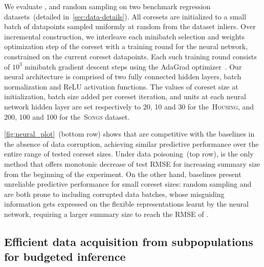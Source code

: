 We evaluate \bcores, \sparsevi{} and random sampling on two benchmark regression datasets~(detailed in~\cref{sec:data-details}). All coresets are initialized to a small batch of datapoints sampled uniformly at random from the dataset inliers. Over incremental construction, we interleave each minibatch selection and weights optimization step of the coreset with a training round for the neural network, constrained on the current coreset datapoints. Each such training round consists of $10^3$ minibatch gradient descent steps using the AdaGrad optimizer~\citep{mcmahan10,duchi10,duchi11}.
Our neural architecture is comprised of two fully connected hidden layers, batch normalization and ReLU activation functions. The values of coreset size at initialization, batch size added per coreset iteration, and units at each neural network hidden layer are set respectively to 20, 10 and 30 for the~\textsc{Housing}, and 200, 100 and 100 for the~\textsc{Songs} dataset.


\cref{fig:neural_plot}~(bottom row) shows that \bcores{} are competitive with the baselines in the absence of data corruption, achieving similar predictive performance over the entire range of tested coreset sizes. Under data poisoning~(top row), \bcores{} is the only method that offers monotonic decrease of test RMSE for increasing summary size from the beginning of the experiment. On the other hand, baselines present unreliable predictive performance for small coreset sizes: random sampling and \sparsevi{} are both prone to including corrupted data batches, whose misguiding information gets expressed on the flexible representations learnt by the neural network, requiring a larger summary size to reach the RMSE of \bcores.




\subsection{Efficient data acquisition from subpopulations for budgeted inference}
\label{sec:active-selection}



